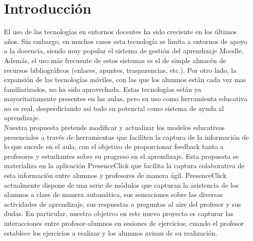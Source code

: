 
\pagestyle{fancy}

\chapter{Introducción}
\label{introduccion}

El uso de las tecnologías en entornos docentes ha sido creciente en los últimos años. Sin embargo, en muchos casos esta tecnología se limita a entornos de apoyo a la docencia, siendo muy popular el sistema de gestión del aprendizaje Moodle. Además, el uso más frecuente de estos sistemas es el de simple almacén de recursos bibliográficos (enlaces, apuntes, trasparencias, etc.). Por otro lado, la expansión de las tecnologías móviles, con las que los alumnos están cada vez mas familiarizados, no ha sido aprovechada. Estas tecnologías están ya mayoritariamente presentes en las aulas, pero su uso como herramienta educativa no es real, desperdiciando así todo su potencial como sistema de ayuda al aprendizaje.\\

Nuestra propuesta pretende modificar y actualizar los modelos educativos presenciales a través de herramientas que faciliten la captura de la información de lo que sucede en el aula, con el objetivo de proporcionar feedback tanto a profesores y estudiantes sobre su progreso en el aprendizaje. Esta propuesta se materializa en la aplicación PresenceClick que facilita la captura colaborativa de esta información entre alumnos y profesores de manera ágil. PresenceClick actualmente dispone de una serie de módulos que capturan la asistencia de los alumnos a clase de manera automática, sus sensaciones sobre las diversas actividades de aprendizaje, sus respuestas a preguntas al aire del profesor y sus dudas. En particular, nuestro objetivo en este nuevo proyecto es capturar las interacciones entre profesor-alumnos en sesiones de ejercicios; cuando el profesor establece los ejercicios a realizar y los alumnos avisan de su realización.\\

